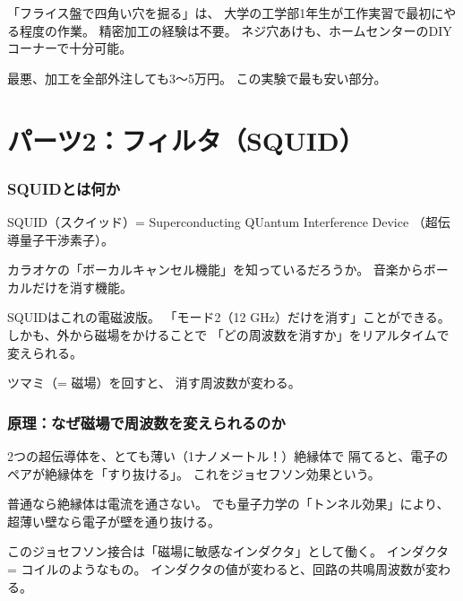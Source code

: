 \documentclass[12pt,a4paper]{article}
\begin{document}
\begin{tatoebabox}[工作のレベル感]
「フライス盤で四角い穴を掘る」は、
大学の工学部1年生が工作実習で最初にやる程度の作業。
精密加工の経験は不要。
ネジ穴あけも、ホームセンターのDIYコーナーで十分可能。

最悪、加工を全部外注しても3〜5万円。
この実験で最も安い部分。
\end{tatoebabox}

\part{パーツ2：フィルタ（SQUID）}

\section{SQUIDとは何か}

SQUID（スクイッド）= Superconducting QUantum Interference Device
（超伝導量子干渉素子）。

\begin{tatoebabox}
カラオケの「ボーカルキャンセル機能」を知っているだろうか。
音楽からボーカルだけを消す機能。

SQUIDはこれの電磁波版。
「モード2（12 GHz）だけを消す」ことができる。
しかも、外から磁場をかけることで
「どの周波数を消すか」をリアルタイムで変えられる。

ツマミ（= 磁場）を回すと、
消す周波数が変わる。
\end{tatoebabox}

\section{原理：なぜ磁場で周波数を変えられるのか}

\begin{naruhodox}[ジョセフソン接合]
2つの超伝導体を、とても薄い（1ナノメートル！）絶縁体で
隔てると、電子のペアが絶縁体を「すり抜ける」。
これをジョセフソン効果という。

普通なら絶縁体は電流を通さない。
でも量子力学の「トンネル効果」により、
超薄い壁なら電子が壁を通り抜ける。

このジョセフソン接合は「磁場に敏感なインダクタ」として働く。
インダクタ = コイルのようなもの。
インダクタの値が変わると、回路の共鳴周波数が変わる。
\end{naruhodox}
\end{document}
